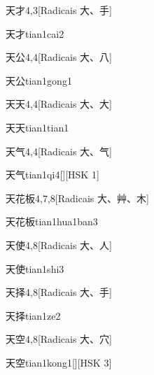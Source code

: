 \begin{entry}{天才}{4,3}[Radicais ⼤、⼿]
  \begin{phonetics}{天才}{tian1cai2}
  \end{phonetics}
\end{entry}

\begin{entry}{天公}{4,4}[Radicais ⼤、⼋]
  \begin{phonetics}{天公}{tian1gong1}
  \end{phonetics}
\end{entry}

\begin{entry}{天天}{4,4}[Radicais ⼤、⼤]
  \begin{phonetics}{天天}{tian1tian1}
  \end{phonetics}
\end{entry}

\begin{entry}{天气}{4,4}[Radicais ⼤、⽓]
  \begin{phonetics}{天气}{tian1qi4}[][HSK 1]
  \end{phonetics}
\end{entry}

\begin{entry}{天花板}{4,7,8}[Radicais ⼤、⾋、⽊]
  \begin{phonetics}{天花板}{tian1hua1ban3}
  \end{phonetics}
\end{entry}

\begin{entry}{天使}{4,8}[Radicais ⼤、⼈]
  \begin{phonetics}{天使}{tian1shi3}
  \end{phonetics}
\end{entry}

\begin{entry}{天择}{4,8}[Radicais ⼤、⼿]
  \begin{phonetics}{天择}{tian1ze2}
  \end{phonetics}
\end{entry}

\begin{entry}{天空}{4,8}[Radicais ⼤、⽳]
  \begin{phonetics}{天空}{tian1kong1}[][HSK 3]
  \end{phonetics}
\end{entry}

